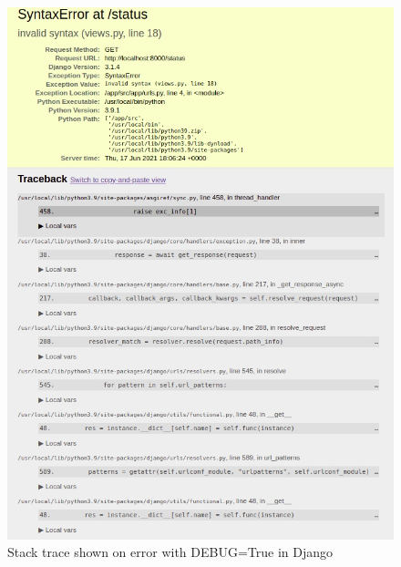 \begin{figure}[H]
    \includegraphics[width=\columnwidth]{figures/pictures/djangoStackTrace.jpg}
    \caption{Stack trace shown on error with DEBUG=True in Django}
    \label{fig:djangoStackTrace}
\end{figure}
